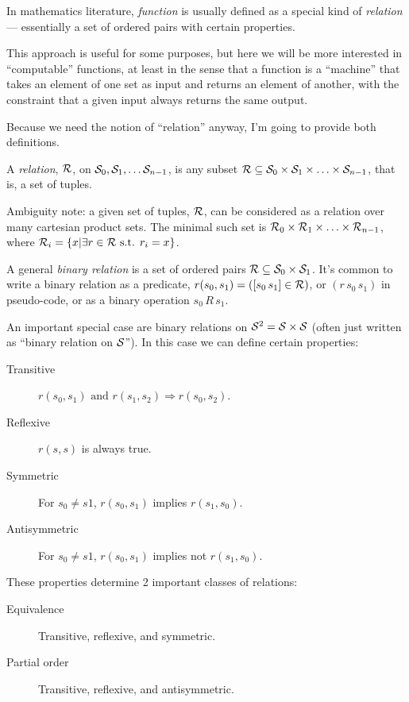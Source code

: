 \label{sec:Functions}

In mathematics literature, \textit{function} is usually defined as
a special kind of \textit{relation} --- essentially a set of
ordered pairs with certain properties.

This approach is useful for some purposes, but here we will be
more interested in ``computable'' functions, at least in the sense
that a function is a ``machine'' that takes an element of one set
as input and returns an element of another, with the constraint
that a given input always returns the same output.

Because we need the notion of ``relation'' anyway, I'm going to
provide both definitions.


A \textit{relation}, 
$\mathcal{R}$, on $\mathcal{S}_0, \mathcal{S}_1, \ldots \mathcal{S}_{n-1}$,  
is any subset 
$\mathcal{R} \subseteq \mathcal{S}_0 \times \mathcal{S}_1 \times \ldots 
\times \mathcal{S}_{n-1}$,
that is, a set of tuples.

Ambiguity note: a given set of tuples, $\mathcal{R}$, can be
considered as a relation over many cartesian product sets.
The minimal such set is 
$\mathcal{R}_0 \times \mathcal{R}_1 \times \ldots \times
\mathcal{R}_{n-1}$, 
where 
$\mathcal{R}_i = \{ x | \exists r 
\in \mathcal{R} \text{ s.t. } r_i = x\}$.

A general \textit{binary relation} is a set of ordered
pairs $\mathcal{R} \subseteq \mathcal{S}_0 \times \mathcal{S}_1$.
It's common to write a binary relation as a predicate, 
$r(s_0,s_1) = ([s_0 \, s_1] \in \mathcal{R})$,
or $(r \, s_0 \, s_1)$ in pseudo-code,
or as a binary operation $s_0 \, R \, s_1$.

An important special case
are binary relations on $\mathcal{S}^2 = \mathcal{S} \times \mathcal{S}$
(often just written as ``binary relation on $\mathcal{S}$''). 
In this case we can define certain properties:

\begin{description}
\item[Transitive]
$r(s_0,s_1) \text{ and } r(s_1,s_2) \Rightarrow r(s_0,s_2)$.
\item[Reflexive] $r(s,s)$ is always true.
\item[Symmetric] For $s_0 \neq s1$, $r(s_0,s_1)$ implies
$r(s_1,s_0)$.
\item[Antisymmetric] For $s_0 \neq s1$, $r(s_0,s_1)$ implies not
$r(s_1,s_0)$.
\end{description}
These properties determine 2 important classes of relations:
\begin{description}
\item[Equivalence] Transitive, reflexive, and symmetric.
\item[Partial order] Transitive, reflexive, and antisymmetric.
\end{description}

